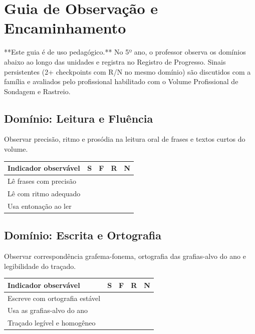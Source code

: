 
\chapter{Guia de Observação e Encaminhamento}

**Este guia é de uso pedagógico.** No 5º ano, o professor observa os domínios abaixo ao longo das unidades e registra no Registro de Progresso. Sinais persistentes (2+ checkpoints com R/N no mesmo domínio) são discutidos com a família e avaliados pelo profissional habilitado com o Volume Profissional de Sondagem e Rastreio.

\section{Domínio: Leitura e Fluência}
Observar precisão, ritmo e prosódia na leitura oral de frases e textos curtos do volume.

\begin{center}
\renewcommand{\arraystretch}{1.4}
\begin{tabular}{@{}p{9cm}cccc@{}}
\toprule
Indicador observável & S & F & R & N \\
\midrule

Lê frases com precisão & & & & \\

Lê com ritmo adequado & & & & \\

Usa entonação ao ler & & & & \\

\bottomrule\end{tabular}\end{center}

\section{Domínio: Escrita e Ortografia}
Observar correspondência grafema-fonema, ortografia das grafias-alvo do ano e legibilidade do traçado.

\begin{center}
\renewcommand{\arraystretch}{1.4}
\begin{tabular}{@{}p{9cm}cccc@{}}
\toprule
Indicador observável & S & F & R & N \\
\midrule

Escreve com ortografia estável & & & & \\

Usa as grafias-alvo do ano & & & & \\

Traçado legível e homogêneo & & & & \\

\bottomrule\end{tabular}\end{center}

